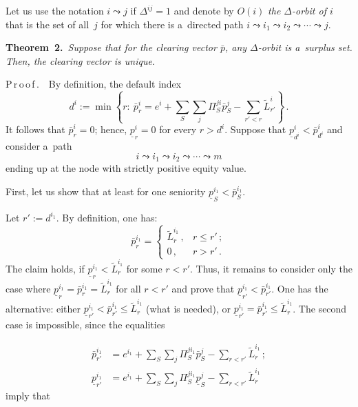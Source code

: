 \begin{multicols}{2}

\noindent
Let us use 
the notation $i\leadsto j$ if $\Delta^{ij}=1$ and  denote by $O(i)$ \textit{the 
$\Delta $-orbit of $i$} that is the set of all~$j$ for which there is 
a~directed path $i\leadsto i_1\leadsto i_2\leadsto\cdots\leadsto j$.

\vspace*{2pt}

\noindent
\textbf{Theorem~2.}\
\textit{Suppose that for the clearing vector $\bar p$, any $\Delta $-orbit is a~surplus 
set.
Then, the clearing vector is unique}.

\vspace*{2pt}

\noindent
P\,r\,o\,o\,f\,.\ \  By definition, the default index
$$
d^i:=\min\left\{r:\ \bar p_r^i=e^i+ \sum\limits_S \sum\limits_j\Pi_S^{ji}
\bar p_{S}^j-\sum\limits_{r'<  r}\tilde L_{r'}^{i}\right \}\,.
$$
It follows that $\bar p_r^i=0$; hence,  $\underline p_r^i=0$ for every $r>d^i$.
Suppose that
$\underline p_{d^i}^i<\bar p_{d^i}^i$ and consider a~path 
$$
i\leadsto  i_1\leadsto i_2\leadsto\cdots \leadsto m
$$ 
ending up at the node with strictly  positive equity value.

First, let us show that at least for one seniority $\underline p^{i_1}_S<\bar 
p^{i_1}_S$.

Let $r':=d^{i_1}$.  By definition, one has: 
$$
\bar p^{i_1}_r=\begin{cases}
\tilde L^{i_1}_r\,, & r\le r'\,;\\
0\,,  & r>r'\,.
\end{cases}
$$
 The claim 
holds, if  $\underline p^{i_1}_r<\tilde L^{i_1}_r$
for some $r<r'$. Thus, it remains to consider only the case where $\underline 
p^{i_1}_r=\bar p^{i_1}_r = \tilde L^{i_1}_r$
for all $r<r'$ and prove that  $\underline p^{i_1}_{r'}<\bar p^{i_1}_{r'}$.
One has the alternative: either $\underline p^{i_1}_{r'}<\bar p^{i_1}_{r'}\le  
\tilde L^{i_1}_r$ (what is needed), or
$\underline p^{i_1}_{r'}=\bar p^{i_1}_{r'}\le  \tilde L^{i_1}_r$. The second 
case is impossible, since the equalities

\noindent
\begin{align*}
\bar p^{i_1}_{r'}&=e^{i_1}+ \sum\limits_S \sum\limits_j\Pi_S^{ji_1}\bar p_{S}^j-
\sum\limits_{r<  r'}\tilde L_{r}^{i_1}\,;\\
\underline p^{i_1}_{r'}&=e^{i_1}+ \sum\limits_S 
\sum\limits_j\Pi_S^{ji_1}\underline p_{S}^j-
\sum\limits_{r< r'}\tilde L_{r}^{i_1}
\end{align*}
imply that


\end{multicols}
